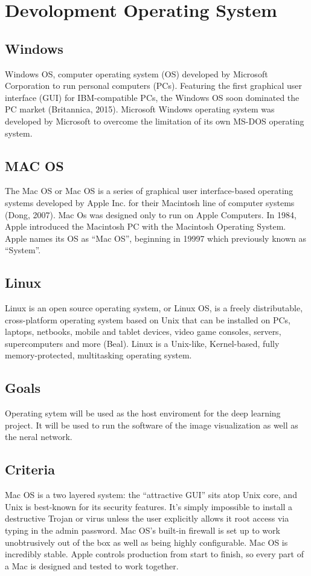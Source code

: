 \documentclass{scrreprt}
\begin{document}
\section{Devolopment Operating System}

\subsection{Windows}
Windows OS, computer operating system (OS) developed by Microsoft Corporation to run personal
computers (PCs). Featuring the first graphical user interface (GUI) for IBM-compatible PCs, the Windows
OS soon dominated the PC market (Britannica, 2015). Microsoft Windows operating system was
developed by Microsoft to overcome the limitation of its own MS-DOS operating system.

\subsection{MAC OS}
The Mac OS or Mac OS is a series of graphical user interface-based operating systems developed by
Apple Inc. for their Macintosh line of computer systems (Dong, 2007). Mac Os was designed only to run
on Apple Computers. In 1984, Apple introduced the Macintosh PC with the Macintosh Operating
System. Apple names its OS as “Mac OS”, beginning in 19997 which previously known as “System”.

\subsection{Linux}
Linux is an open source operating system, or Linux OS, is a freely distributable, cross-platform operating
system based on Unix that can be installed on PCs, laptops, netbooks, mobile and tablet devices, video
game consoles, servers, supercomputers and more (Beal). Linux is a Unix-like, Kernel-based, fully
memory-protected, multitasking operating system.

\subsection{Goals}
Operating sytem will be used as the host enviroment for the deep learning project.
It will be used to run the software of the image visualization as well as the neral network.

\subsection{Criteria}
Mac OS is a two layered system: the “attractive GUI” sits atop Unix core, and Unix is best-known for its
security features. It’s simply impossible to install a destructive Trojan or virus unless the user explicitly
allows it root access via typing in the admin password. Mac OS’s built-in firewall is set up to work
unobtrusively out of the box as well as being highly configurable. Mac OS is incredibly stable. Apple
controls production from start to finish, so every part of a Mac is designed and tested to work together.\newline
\end{document}
